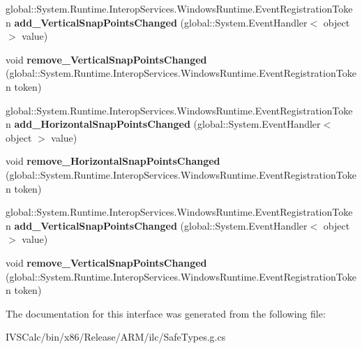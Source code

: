 \begin{DoxyCompactItemize}
\mbox{\label{interface_windows_1_1_u_i_1_1_xaml_1_1_controls_1_1_primitives_1_1_i_scroll_snap_points_info_a571d9a77feb356614085f5bd5c61164d}} 
global\+::\+System.\+Runtime.\+Interop\+Services.\+Windows\+Runtime.\+Event\+Registration\+Token {\bfseries add\+\_\+\+Vertical\+Snap\+Points\+Changed} (global\+::\+System.\+Event\+Handler$<$ object $>$ value)
\item 
\mbox{\label{interface_windows_1_1_u_i_1_1_xaml_1_1_controls_1_1_primitives_1_1_i_scroll_snap_points_info_aa8b329ace55d867384797aed3c99571d}} 
void {\bfseries remove\+\_\+\+Vertical\+Snap\+Points\+Changed} (global\+::\+System.\+Runtime.\+Interop\+Services.\+Windows\+Runtime.\+Event\+Registration\+Token token)
\item 
\mbox{\label{interface_windows_1_1_u_i_1_1_xaml_1_1_controls_1_1_primitives_1_1_i_scroll_snap_points_info_a821f2a593f07df670bedc1aa736522df}} 
global\+::\+System.\+Runtime.\+Interop\+Services.\+Windows\+Runtime.\+Event\+Registration\+Token {\bfseries add\+\_\+\+Horizontal\+Snap\+Points\+Changed} (global\+::\+System.\+Event\+Handler$<$ object $>$ value)
\item 
\mbox{\label{interface_windows_1_1_u_i_1_1_xaml_1_1_controls_1_1_primitives_1_1_i_scroll_snap_points_info_aa3fb03dbd56b4a79ce2cb3184e76cd1a}} 
void {\bfseries remove\+\_\+\+Horizontal\+Snap\+Points\+Changed} (global\+::\+System.\+Runtime.\+Interop\+Services.\+Windows\+Runtime.\+Event\+Registration\+Token token)
\item 
\mbox{\label{interface_windows_1_1_u_i_1_1_xaml_1_1_controls_1_1_primitives_1_1_i_scroll_snap_points_info_a571d9a77feb356614085f5bd5c61164d}} 
global\+::\+System.\+Runtime.\+Interop\+Services.\+Windows\+Runtime.\+Event\+Registration\+Token {\bfseries add\+\_\+\+Vertical\+Snap\+Points\+Changed} (global\+::\+System.\+Event\+Handler$<$ object $>$ value)
\item 
\mbox{\label{interface_windows_1_1_u_i_1_1_xaml_1_1_controls_1_1_primitives_1_1_i_scroll_snap_points_info_aa8b329ace55d867384797aed3c99571d}} 
void {\bfseries remove\+\_\+\+Vertical\+Snap\+Points\+Changed} (global\+::\+System.\+Runtime.\+Interop\+Services.\+Windows\+Runtime.\+Event\+Registration\+Token token)
\end{DoxyCompactItemize}


The documentation for this interface was generated from the following file\+:\begin{DoxyCompactItemize}
\item 
I\+V\+S\+Calc/bin/x86/\+Release/\+A\+R\+M/ilc/Safe\+Types.\+g.\+cs\end{DoxyCompactItemize}

